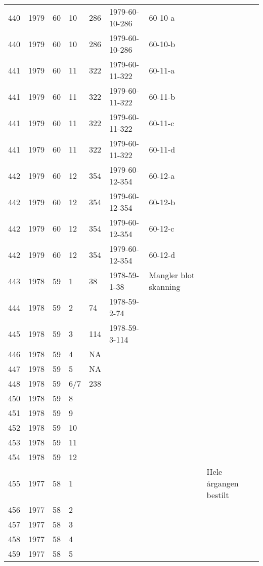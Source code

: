\begin{longtable}{ |l|l|l|l|l|l|l|l| }
440 & 1979 & 60 &    10 &     286 & 1979-60-10-286 & 60-10-a & \\
440 & 1979 & 60 &    10 &     286 & 1979-60-10-286 & 60-10-b & \\
441 & 1979 & 60 &    11 &     322 & 1979-60-11-322 & 60-11-a & \\
441 & 1979 & 60 &    11 &     322 & 1979-60-11-322 & 60-11-b & \\
441 & 1979 & 60 &    11 &     322 & 1979-60-11-322 & 60-11-c & \\
441 & 1979 & 60 &    11 &     322 & 1979-60-11-322 & 60-11-d & \\
442 & 1979 & 60 &    12 &     354 & 1979-60-12-354 & 60-12-a & \\
442 & 1979 & 60 &    12 &     354 & 1979-60-12-354 & 60-12-b & \\
442 & 1979 & 60 &    12 &     354 & 1979-60-12-354 & 60-12-c & \\
442 & 1979 & 60 &    12 &     354 & 1979-60-12-354 & 60-12-d & \\
443 & 1978 & 59 &     1 &      38 & 1978-59-1-38   & Mangler blot skanning & \\
444 & 1978 & 59 &     2 &      74 & 1978-59-2-74   &  & \\
445 & 1978 & 59 &     3 &     114 & 1978-59-3-114  &  & \\
446 & 1978 & 59 &     4 &      NA &                &  & \\
447 & 1978 & 59 &     5 &      NA &                &  & \\
448 & 1978 & 59 &   6/7 &     238 &                &  & \\
450 & 1978 & 59 &     8 &         &                &  & \\
451 & 1978 & 59 &     9 &         &                &   & \\
452 & 1978 & 59 &    10 &         &                &  & \\
453 & 1978 & 59 &    11 &         &                &  & \\
454 & 1978 & 59 &    12 &         &                &  & \\
455 & 1977 & 58 &     1 &         &                &  & Hele årgangen bestilt \\
456 & 1977 & 58 &     2 &         &                &  & \\
457 & 1977 & 58 &     3 &         &                &  & \\
458 & 1977 & 58 &     4 &         &                &  & \\
459 & 1977 & 58 &     5 &         &                &  & \\

\end{longtable}
